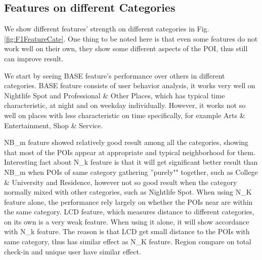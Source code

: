 \subsection{Features on different Categories}
We show different features' strength on different categories in Fig. \ref{fig:F1FeatureCate}. One thing to be noted here is that even some features do not work well on their own, they show some different aspects of the POI, thus still can improve result.

We start by seeing BASE feature's performance over others in different categories. BASE feature consists of user behavior analysis, it works very well on Nightlife Spot and Professional \& Other Places, which has typical time characteristic, at night and on weekday individually. However, it works not so well on places with less characteristic on time specifically, for example Arts \& Entertainment, Shop \& Service.

NB\_m feature showed relatively good result among all the categories, showing that most of the POIs appear at appropriate and typical neighborhood for them. Interesting fact about N\_k feature is that it will get significant better result than NB\_m when POIs of same category gathering ''purely"" together, such as College \& University and Residence, however not so good result when the category normally mixed with other categories, such as Nightlife Spot. When using N\_K feature alone, the performance rely largely on whether the POIs near are within the same category. LCD feature, which measures distance to different categories, on its own is a very weak feature. When using it alone, it will show accordance with N\_k feature. The reason is that LCD get small distance to the POIs with same category, thus has similar effect as N\_K feature. Region compare on total check-in and unique user have similar effect.


